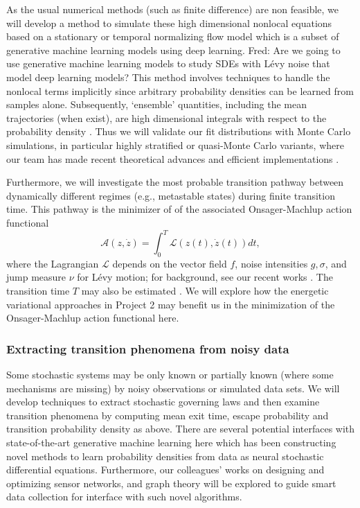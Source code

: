 \documentclass[11pt]{NSFamsart}
\newcommand{\FredNote}[1]{{\color{blue} Fred: #1}}
\begin{document}
 
As the usual numerical methods (such as finite difference) are non feasible, we will develop a method to simulate these high dimensional nonlocal equations based on a stationary or temporal normalizing flow model which is a subset of generative machine learning models using deep learning. \FredNote{Are we going to use generative machine learning models to study SDEs with L\'evy noise that model deep learning models?} This method involves techniques to handle the nonlocal terms implicitly since arbitrary probability densities can be learned from samples alone. Subsequently, `ensemble' quantities, including the mean trajectories (when exist), are high dimensional integrals with respect to the probability density \cite{DuanBook2015}.  Thus we will validate our fit distributions with Monte Carlo simulations, in particular highly stratified or quasi-Monte Carlo variants, where our team has made recent theoretical advances \cite{Hic17a, HicEtal17a} and efficient implementations \cite{QMCPy2020a}. 

Furthermore, we will investigate the most probable transition pathway between dynamically different regimes (e.g., metastable states) during finite transition time. This pathway is the minimizer of  
of the associated Onsager-Machlup action functional 
$$
\mathcal{A}(z, \dot z) = \int_0^T \mathcal{L}(z(t), \dot z(t)) dt,
$$
where the Lagrangian  $\mathcal{L}$ depends on the vector field $f$, noise intensities $g, \sigma$, and  jump measure $\nu$ for L\'evy motion; for background, see   our recent works \cite{ChaoDuanOM,HuangYF}. The   transition time $T$ may also be estimated \cite{HuangYF2020}. We will explore how the energetic variational approaches in Project 2 may benefit us in the minimization of the Onsager-Machlup action functional here. 


 
\subsubsection*{Extracting transition phenomena from noisy data}
Some   stochastic systems may be only known or partially known (where some mechanisms are missing) by   noisy observations or simulated data sets. We will  develop techniques to extract stochastic governing laws \cite{YangLi2020a} and then examine transition phenomena by computing mean exit time, escape probability and transition probability density as above. 
There are several potential interfaces with state-of-the-art generative machine learning here which has been constructing novel methods to learn probability densities from data as neural stochastic differential equations. Furthermore, our colleagues'  works on 
designing and optimizing sensor networks, and graph theory \cite{karwa2016statistical,Calines2008MonitoringSF} will be explored to guide smart data collection for interface with such novel algorithms. 
\end{document}

